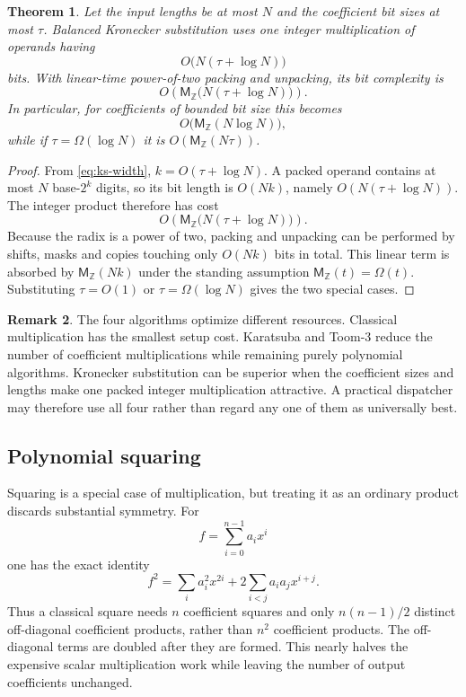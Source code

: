 \documentclass[11pt]{book}
\newtheorem{theorem}{Theorem}[section]
\theoremstyle{definition}
\newtheorem{remark}[theorem]{Remark}
\newcommand{\ZZ}{\mathbb Z}
\newcommand{\MZ}{\mathsf M_{\ZZ}}
\begin{document}
\begin{theorem}\label{thm:ks-complexity}
Let the input lengths be at most $N$ and the coefficient bit sizes at most
$\tau$.  Balanced Kronecker substitution uses one integer multiplication of
operands having
\[
 O\bigl(N(\tau+\log N)\bigr)
\]
bits.  With linear-time power-of-two packing and unpacking, its bit complexity
is
\[
 O\!\left(
 \MZ\bigl(N(\tau+\log N)\bigr)
 \right).
\]
In particular, for coefficients of bounded bit size this becomes
\[
 O\bigl(\MZ(N\log N)\bigr),
\]
while if $\tau=\Omega(\log N)$ it is
$O(\MZ(N\tau))$.
\end{theorem}

\begin{proof}
From \eqref{eq:ks-width}, $k=O(\tau+\log N)$.  A packed operand contains at
most $N$ base-$2^k$ digits, so its bit length is $O(Nk)$, namely
$O(N(\tau+\log N))$.  The integer product therefore has cost
\[
 O\!\left(\MZ\bigl(N(\tau+\log N)\bigr)\right).
\]
Because the radix is a power of two, packing and unpacking can be performed by
shifts, masks and copies touching only $O(Nk)$ bits in total.  This linear term
is absorbed by $\MZ(Nk)$ under the standing assumption
$\MZ(t)=\Omega(t)$.  Substituting $\tau=O(1)$ or
$\tau=\Omega(\log N)$ gives the two special cases.
\end{proof}

\begin{remark}
The four algorithms optimize different resources.  Classical multiplication
has the smallest setup cost.  Karatsuba and Toom-3 reduce the number of
coefficient multiplications while remaining purely polynomial algorithms.
Kronecker substitution can be superior when the coefficient sizes and lengths
make one packed integer multiplication attractive.  A practical dispatcher may
therefore use all four rather than regard any one of them as universally best.
\end{remark}


\subsection{Polynomial squaring}\label{sec:poly-squaring}

Squaring is a special case of multiplication, but treating it as an ordinary
product discards substantial symmetry.  For
\[
 f=\sum_{i=0}^{n-1} a_i x^i
\]
one has the exact identity
\begin{equation}\label{eq:classical-square}
 f^2=\sum_i a_i^2x^{2i}+2\sum_{i<j}a_i a_jx^{i+j}.
\end{equation}
Thus a classical square needs $n$ coefficient squares and only
$n(n-1)/2$ distinct off-diagonal coefficient products, rather than $n^2$
coefficient products.  The off-diagonal terms are doubled after they are
formed.  This nearly halves the expensive scalar multiplication work while
leaving the number of output coefficients unchanged.
\end{document}
